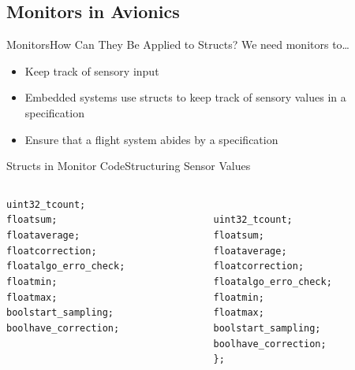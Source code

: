 \documentclass[xcolor={dvipsnames}]{beamer}
\begin{document}
\subsection{Monitors in Avionics}
\begin{frame}{Monitors}{How Can They Be Applied to Structs?}
  We need monitors to\dots
  \begin{itemize}
  \item
    Keep track of sensory input
  \item
    Embedded systems \alert{use structs} to keep track of sensory values in a specification
  \item
    Ensure that a flight system abides by a \alert{specification}
  \end{itemize}
\end{frame}
\begin{frame}{Structs in Monitor Code}{Structuring Sensor Values}
    \begin{alltt}
    \begin{columns}
      \begin{column}{0.25\textwidth}
        \scriptsize\par{\textcolor{Peach}{uint32\_t count;\\
        float    sum;\\
        float    average;\\
        float    correction;\\
        float    algo\_erro\_check;\\
        float    min;\\
        float    max;\\
        bool     start\_sampling;\\
        bool     have\_correction;}}
      \end{column}
      \makebox[1in]{\rightarrowfill}
      \begin{column}{0.5\textwidth}
        \setlength{\parindent}{10pt}
        \scriptsize\par{\noindent{\textcolor{Emerald}{struct NeutralThrustEstimation} \{ \\}
        \textcolor{Peach}{uint32\_t count;\\
        float    sum;\\
        float    average;\\
        float    correction;\\
        float    algo\_erro\_check;\\
        float    min;\\
        float    max;\\
        bool     start\_sampling;\\
        bool     have\_correction;}\\
        \};\\
        }
      \end{column}
    \end{columns}
    \end{alltt}
\end{frame}
\end{document}
